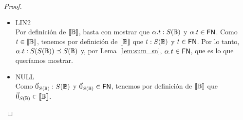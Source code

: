 \begin{proof}
\begin{itemize}
    \item LIN2
      \\ Por definición de \( \llbracket\mathbb{B}\rrbracket \), basta con mostrar que \( \alpha . t : S(\mathbb{B}) \) y \( \alpha . t \in \mathsf{FN} \). Como \( t \in \llbracket\mathbb{B}\rrbracket \), tenemos por definición de \( \llbracket\mathbb{B}\rrbracket \) que \( t : S(\mathbb{B}) \) y \( t \in \mathsf{FN} \). Por lo tanto, \( \alpha . t : S(S(\mathbb{B})) \preceq S(\mathbb{B}) \) y, por Lema~\ref{lem:sum_sn}, \( \alpha . t \in \mathsf{FN} \), que es lo que queríamos mostrar.
    \item NULL
      \\ Como \( \vec{0}_{S (\mathbb{B})} : S(\mathbb{B}) \) y \( \vec{0}_{S (\mathbb{B})} \in \mathsf{FN} \), tenemos por definición de \( \llbracket\mathbb{B}\rrbracket \) que \( \vec{0}_{S (\mathbb{B})} \in \llbracket\mathbb{B}\rrbracket \).
  \end{itemize}

\end{proof}
